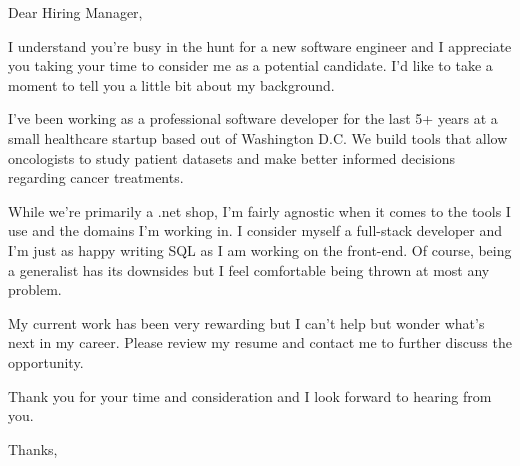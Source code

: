 \documentclass{letter}
\begin{document}
\begin{letter} {}
\opening{Dear Hiring Manager,}
 
I understand you're busy in the hunt for a new software engineer and I appreciate you taking your time to consider me as a potential candidate. I'd like to take a moment to tell you a little bit about my background. 
	
I've been working as a professional software developer for the last 5+ years at a small healthcare startup based out of Washington D.C. We build tools that allow oncologists to study patient datasets and make better informed decisions regarding cancer treatments.

While we're primarily a .net shop, I'm fairly agnostic when it comes to the tools I use and the domains I'm working in. I consider myself a full-stack developer and I'm just as happy writing SQL as I am working on the front-end. Of course, being a generalist has its downsides but I feel comfortable being thrown at most any problem.

My current work has been very rewarding but I can't help but wonder what's next in my career. Please review my resume and contact me to further discuss the opportunity.
 
Thank you for your time and consideration and I look forward to hearing from you.
 
\closing{Thanks,}

\end{letter}
 
\end{document}
